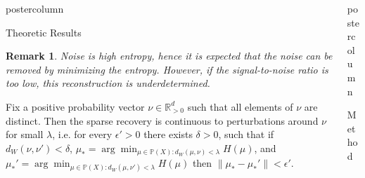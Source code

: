 \documentclass{beamer}
\newtheorem*{remark}{Remark}
\newcommand{\R}{{\mathbb{R}}}
\newcommand{\bbP}{{\mathbb{P}}}
\newlength{\columnheight}
\begin{document}
\begin{frame}
\begin{columns}
\begin{column}{.5\textwidth}
\begin{beamercolorbox}[center]{postercolumn}
\begin{minipage}{.98\textwidth}
{\begin{myblock}{Theoretic Results}
\begin{remark}
    \quad Noise is high entropy, hence it is expected that the noise can be removed by minimizing the entropy. However, if the signal-to-noise ratio is too low, this reconstruction is underdetermined.
\end{remark}

\begin{theorem}
    Fix a positive probability vector $\nu\in\R^d_{>0}$ such that all elements of $\nu$ are distinct. 
    Then the sparse recovery is continuous to perturbations around $\nu$ for small $\lambda$, i.e. for every $\epsilon'>0$ there exists $\delta>0$, such that 
    if $d_W(\nu,\nu')<\delta$,
    $\mu_* = \arg\min_{\mu \in \bbP(X) : d_W(\mu, \nu)<\lambda} H(\mu)$,
    and 
    $\mu_*' = \arg\min_{\mu \in \bbP(X) : d_W(\mu, \nu')<\lambda} H(\mu)$
    then $\|\mu_*-\mu_*'\| < \epsilon'.$
    \label{thm:robust}
\end{theorem}

					\end{myblock}\vfill
     
		}\end{minipage}\end{beamercolorbox}
	\end{column}
	\begin{column}{.5\textwidth}
		\begin{beamercolorbox}[center]{postercolumn}
			\begin{minipage}{.98\textwidth} %
				\parbox[t][\columnheight]{\textwidth}{ %

					\begin{myblock}{Method}







    


\end{myblock}}
\end{minipage}
\end{beamercolorbox}
\end{column}
\end{columns}
\end{frame}
\end{document}
